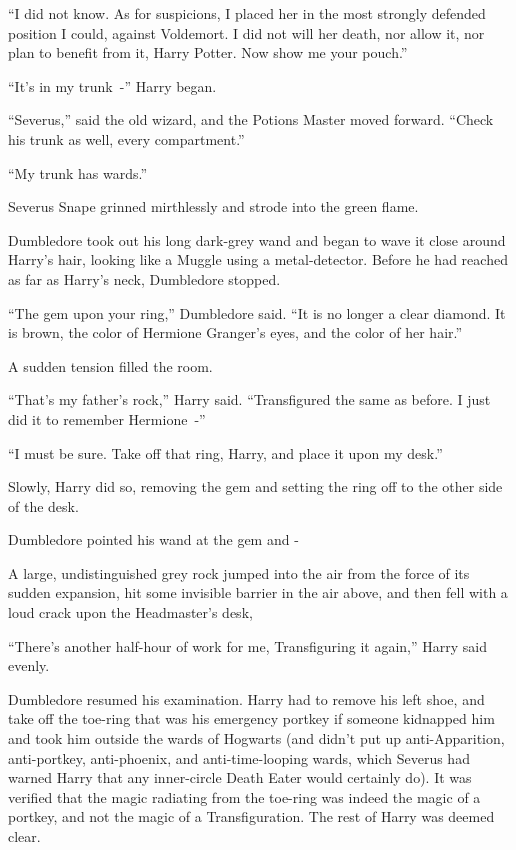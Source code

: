 ``I did not know. As for suspicions, I placed her in the most strongly defended position I could, against Voldemort. I did not will her death, nor allow it, nor plan to benefit from it, Harry Potter. Now show me your pouch.''

``It's in my trunk~-'' Harry began.

``Severus,'' said the old wizard, and the Potions Master moved forward. ``Check his trunk as well, every compartment.''

``My trunk has wards.''

Severus Snape grinned mirthlessly and strode into the green flame.

Dumbledore took out his long dark-grey wand and began to wave it close around Harry's hair, looking like a Muggle using a metal-detector. Before he had reached as far as Harry's neck, Dumbledore stopped.

``The gem upon your ring,'' Dumbledore said. ``It is no longer a clear diamond. It is brown, the color of Hermione Granger's eyes, and the color of her hair.''

A sudden tension filled the room.

``That's my father's rock,'' Harry said. ``Transfigured the same as before. I just did it to remember Hermione~-''

``I must be sure. Take off that ring, Harry, and place it upon my desk.''

Slowly, Harry did so, removing the gem and setting the ring off to the other side of the desk.

Dumbledore pointed his wand at the gem and -

A large, undistinguished grey rock jumped into the air from the force of its sudden expansion, hit some invisible barrier in the air above, and then fell with a loud crack upon the Headmaster's desk,

``There's another half-hour of work for me, Transfiguring it again,'' Harry said evenly.

Dumbledore resumed his examination. Harry had to remove his left shoe, and take off the toe-ring that was his emergency portkey if someone kidnapped him and took him outside the wards of Hogwarts (and didn't put up anti-Apparition, anti-portkey, anti-phoenix, and anti-time-looping wards, which Severus had warned Harry that any inner-circle Death Eater would certainly do). It was verified that the magic radiating from the toe-ring was indeed the magic of a portkey, and not the magic of a Transfiguration. The rest of Harry was deemed clear.

